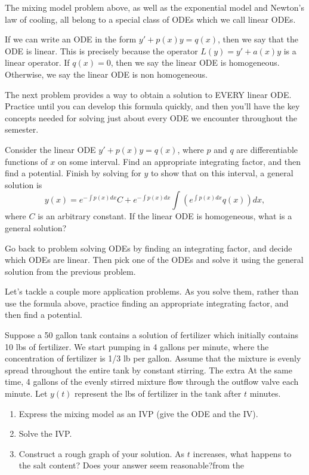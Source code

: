 The mixing model problem above, as well as the exponential model and Newton's law of cooling, all belong to a special class of ODEs which we call linear ODEs.

\begin{definition}
 If we can write an ODE in the form $y'+p(x)y=q(x)$, then we say that the ODE is linear. This is precisely because the operator $L(y) = y'+a(x)y$ is a linear operator.  If $q(x)=0$, then we say the linear ODE is homogeneous. Otherwise, we say the linear ODE is non homogeneous.
\end{definition}

The next problem provides a way to obtain a solution to EVERY linear ODE. Practice until you can develop this formula quickly, and then you'll have the key concepts needed for solving just about every ODE we encounter throughout the semester.

\begin{problem}
 Consider the linear ODE $y'+p(x)y=q(x)$, where $p$ and $q$ are differentiable functions of $x$ on some interval.  Find an appropriate integrating factor, and then find a potential. Finish by solving for $y$ to show that on this interval, a general solution is $$y(x) = e^{-\int p(x) dx}C+e^{-\int p(x) dx} \int \left(e^{\int p(x)dx} q(x) \right)dx,$$ where $C$ is an arbitrary constant. If the linear ODE is homogeneous, what is a general solution?
\end{problem}


\begin{problem*}[14 and $1/2$:]
 Go back to problem {solving ODEs by finding an integrating factor}, and decide which ODEs are linear.  Then pick one of the ODEs and solve it using the general solution from the previous problem.
\end{problem*}

Let's tackle a couple more application problems.  As you solve them, rather than use the formula above, practice finding an appropriate integrating factor, and then find a potential.

\begin{problem}
Suppose a 50 gallon tank contains a solution of fertilizer which initially contains 10 lbs of fertilizer. We start pumping in 4 gallons per minute, where the concentration of fertilizer is 1/3 lb per gallon. Assume that the mixture is evenly spread throughout the entire tank by constant stirring. The extra  At the same time, 4 gallons of the evenly stirred mixture flow through the outflow valve each minute. Let $y(t)$ represent the lbs of fertilizer in the tank after $t$ minutes.
\begin{enumerate}
 \item Express the mixing model as an IVP (give the ODE and the IV).
 \item Solve the IVP.
 \item Construct a rough graph of your solution.  As $t$ increases, what happens to the salt content? Does your answer seem reasonable?from the 
\end{enumerate}
\end{problem}

